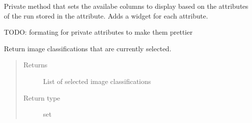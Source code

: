 \documentclass[letterpaper,10pt,english]{sphinxmanual}
\begin{document}
\begin{fulllineitems}
\begin{fulllineitems}
\end{fulllineitems}


\begin{fulllineitems}
\label{\detokenize{polo.widgets:polo.widgets.table_inspector.TableInspector._set_column_options}}
Private method that sets the availabe columns to display
based on the attributes of the run stored in the  attribute.
Adds a  widget for each attribute.

TODO: formating for private attributes to make them prettier

\end{fulllineitems}


\begin{fulllineitems}
\label{\detokenize{polo.widgets:polo.widgets.table_inspector.TableInspector.run}}
\end{fulllineitems}


\begin{fulllineitems}
\label{\detokenize{polo.widgets:polo.widgets.table_inspector.TableInspector.selected_classifications}}
Return image classifications that are currently selected.
\begin{quote}\begin{description}
\item[{Returns}] \leavevmode
List of selected image classifications

\item[{Return type}] \leavevmode
set

\end{description}\end{quote}


\end{fulllineitems}
\end{fulllineitems}
\end{document}
